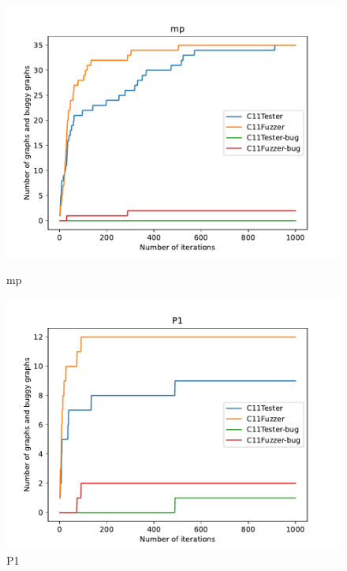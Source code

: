 \begin{figure}[H]
	\vspace{0.5cm}

	\begin{minipage}{0.45\textwidth}
		\centering
		\includegraphics[width=\textwidth]{figure/hardbug/mp_bug.pdf}
		\caption{mp}
		\label{hardbug:mp}
	\end{minipage}
	\hfill
	\begin{minipage}{0.45\textwidth}
		\centering
		\includegraphics[width=\textwidth]{figure/hardbug/P1_bug.pdf}
		\caption{P1}
		\label{header:P1}
	\end{minipage}





\end{figure}
